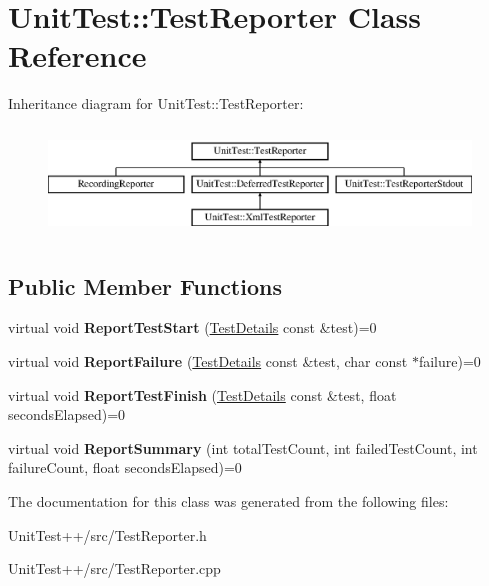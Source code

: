 \hypertarget{classUnitTest_1_1TestReporter}{\section{Unit\-Test\-:\-:Test\-Reporter Class Reference}
\label{classUnitTest_1_1TestReporter}
}
Inheritance diagram for Unit\-Test\-:\-:Test\-Reporter\-:\begin{figure}[H]
\begin{center}
\leavevmode
\includegraphics[height=2.901554cm]{classUnitTest_1_1TestReporter}
\end{center}
\end{figure}
\subsection*{Public Member Functions}
\begin{DoxyCompactItemize}
\item 
\hypertarget{classUnitTest_1_1TestReporter_a94f1ab9311190188a2f96f8c2da785b1}{virtual void {\bfseries Report\-Test\-Start} (\hyperlink{classUnitTest_1_1TestDetails}{Test\-Details} const \&test)=0}\label{classUnitTest_1_1TestReporter_a94f1ab9311190188a2f96f8c2da785b1}

\item 
\hypertarget{classUnitTest_1_1TestReporter_a55195826cc03302f7a54f728c79102d5}{virtual void {\bfseries Report\-Failure} (\hyperlink{classUnitTest_1_1TestDetails}{Test\-Details} const \&test, char const $\ast$failure)=0}\label{classUnitTest_1_1TestReporter_a55195826cc03302f7a54f728c79102d5}

\item 
\hypertarget{classUnitTest_1_1TestReporter_a6492379c31985a77a22f1ccf684e44da}{virtual void {\bfseries Report\-Test\-Finish} (\hyperlink{classUnitTest_1_1TestDetails}{Test\-Details} const \&test, float seconds\-Elapsed)=0}\label{classUnitTest_1_1TestReporter_a6492379c31985a77a22f1ccf684e44da}

\item 
\hypertarget{classUnitTest_1_1TestReporter_a8f5010c52b4be55ac4796e24cc669274}{virtual void {\bfseries Report\-Summary} (int total\-Test\-Count, int failed\-Test\-Count, int failure\-Count, float seconds\-Elapsed)=0}\label{classUnitTest_1_1TestReporter_a8f5010c52b4be55ac4796e24cc669274}

\end{DoxyCompactItemize}


The documentation for this class was generated from the following files\-:\begin{DoxyCompactItemize}
\item 
Unit\-Test++/src/Test\-Reporter.\-h\item 
Unit\-Test++/src/Test\-Reporter.\-cpp\end{DoxyCompactItemize}
